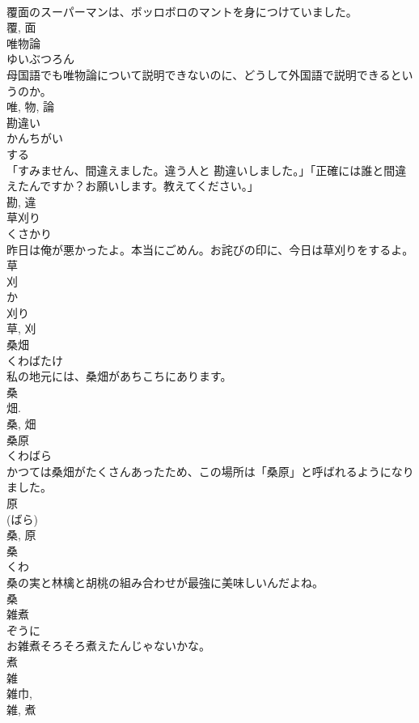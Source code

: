 \documentclass[8pt]{extreport}
\begin{document}
\begin{CJK}{UTF8}{min}
\\	覆面のスーパーマンは、ボッロボロのマントを身につけていました。	
\\	覆, 面	
\\	唯物論	
\\	ゆいぶつろん	
\\	母国語でも唯物論について説明できないのに、どうして外国語で説明できるというのか。	
\\	唯, 物, 論	
\\	勘違い	
\\	かんちがい	
\\	する 
\\	「すみません、間違えました。違う人と 勘違いしました。」「正確には誰と間違えたんですか？お願いします。教えてください。」	
\\	勘, 違	
\\	草刈り	
\\	くさかり	
\\	昨日は俺が悪かったよ。本当にごめん。お詫びの印に、今日は草刈りをするよ。	
\\	草 
\\	刈 
\\	か 
\\	刈り 
\\	草, 刈	
\\	桑畑	
\\	くわばたけ	
\\	私の地元には、桑畑があちこちにあります。	
\\	桑 
\\	畑. 
\\	桑, 畑	
\\	桑原	
\\	くわばら	
\\	かつては桑畑がたくさんあったため、この場所は「桑原」と呼ばれるようになりました。	
\\	原 
\\	(ばら) 
\\	桑, 原	
\\	桑	
\\	くわ	
\\	桑の実と林檎と胡桃の組み合わせが最強に美味しいんだよね。	
\\	桑	
\\	雑煮	
\\	ぞうに	
\\	お雑煮そろそろ煮えたんじゃないかな。	
\\	煮 
\\	雑 
\\	雑巾, 
\\	雑, 煮	

\end{CJK}
\end{document}
